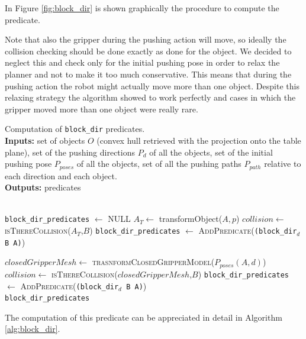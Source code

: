 In Figure \ref{fig:block_dir} is shown graphically the procedure to compute the predicate. 


Note that also the gripper during the pushing action will move, so ideally the collision checking should be done exactly as done for the object. We decided to neglect this and check only for the initial pushing pose in order to relax the planner and not to make it too much conservative. This means that during the pushing action the robot might actually move more than one object. Despite this relaxing strategy the algorithm showed to work perfectly and cases in which the gripper moved more than one object were really rare.

\begin{algorithm}[h]
\caption{Computation of \texttt{block\_dir} predicates. \\
\textbf{Inputs:} set of objects $O$ (convex hull retrieved with the projection onto the table plane), set of the pushing directions $P_d$ of all the objects, set of the initial pushing pose $P_{poses}$ of all the objects, set of all the pushing paths $P_{path}$ relative to each direction and each object. \\
\textbf{Outputs:}  predicates}\label{alg:block_dir}
\begin{algorithmic}
\\
\texttt{block\_dir\_predicates} $\gets$ \textsc{NULL}
  \State $A_T \gets$ {\sc transformObject($A,p$)}
	\State $collision \gets$ \textsc{isThereCollision($A_T$,$B$)}
		\State \texttt{block\_dir\_predicates} $\gets$ \textsc{AddPredicate}(\texttt{(block\_dir$_d$ B A)})
	\EndIf
  \EndIf
  \EndFor 
  \EndFor

  \State $closedGripperMesh \gets$ \textsc{trasnformClosedGripperModel}($P_{poses}(A,d)$)
	\State $collision \gets$ \textsc{isThereCollision($closedGripperMesh$,$B$)}
		\State \texttt{block\_dir\_predicates} $\gets$ \textsc{AddPredicate}(\texttt{(block\_dir$_d$ B A)})
	\EndIf
  \EndIf
  \EndFor
\EndFor 
\EndFor \\
\Return  \texttt{block\_dir\_predicates}
\EndFunction
\end{algorithmic}
\end{algorithm}  
The computation of this predicate can be appreciated in detail in Algorithm \ref{alg:block_dir}.%

